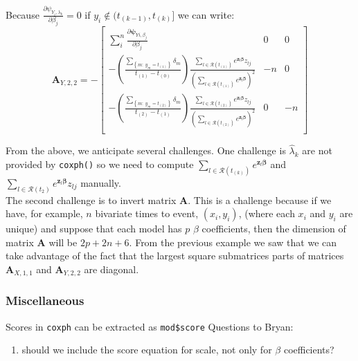 \documentclass[]{article}
\begin{document}
Because $\frac{\partial \psi_{Y_i,\lambda_k}}{  \partial \beta_j} =0$ if $y_i \notin (t_{(k-1)}, t_{(k)}]$ we can write:
  \[
  \pmb{A}_{Y,2,2}
   =-\begin{bmatrix}
      \sum_i^n\frac{\partial \pmb{\psi}_{Yi,\beta_j}}{ \partial \beta_j} & 0 & 0 \\
      -\left( \frac{\sum_{\left\{m:~y_m = t_{(1)}\right\}} \delta_m}{t_{(1)} - t_{(0)}}  \right)   \frac{     \sum_{l\in \mathcal{R}(t_{(1)})}  e^{\pmb{z}_l\pmb{\beta}} z_{lj}  }{\left(   \sum_{l\in \mathcal{R}(t_{(1)})} e^{\pmb{z}_l\pmb{\beta}}  \right)^2} & -n & 0 \\
      -\left( \frac{\sum_{\left\{m:~y_m = t_{(2)}\right\}} \delta_m}{t_{(2)} - t_{(1)}}  \right)   \frac{     \sum_{l\in \mathcal{R}(t_{(2)})}  e^{\pmb{z}_l\pmb{\beta}} z_{lj}  }{\left(   \sum_{l\in \mathcal{R}(t_{(2)})} e^{\pmb{z}_l\pmb{\beta}}  \right)^2} & 0 & -n \\
  \end{bmatrix}
  \]

From the above, we anticipate several challenges. One challenge is $\hat{\lambda}_k$ are not provided by \texttt{coxph()} so we need to compute $\sum_{l\in \mathcal{R}(t_{(k)})} e^{\pmb{z}_l\pmb{\beta}}$ and $\sum_{l\in \mathcal{R}(t_2)}  e^{\pmb{z}_l\pmb{\beta}} z_{lj}$ manually.\\
The second challenge is to invert matrix $\pmb{A}$. This is a challenge because if we have, for example, $n$ bivariate times to event, $(x_i,y_i)$, (where each $x_i$ and $y_i$ are unique) and suppose that each model has $p$ $\beta$ coefficients, then the dimension of matrix $\pmb{A}$ will be $2p + 2n + 6$. From the previous example we saw that we can take advantage of the fact that the  largest square submatrices parts of matrices $\pmb{A}_{X,1,1}$ and $\pmb{A}_{Y,2,2}$ are diagonal.



\clearpage

\subsubsection{Miscellaneous}
Scores in \texttt{coxph} can be extracted as \texttt{mod\$score}
Questions to Bryan:
\begin{enumerate}[1)]
  \item should we include the score equation for scale, not only for $\beta$ coefficients?
\end{enumerate}
\end{document}
